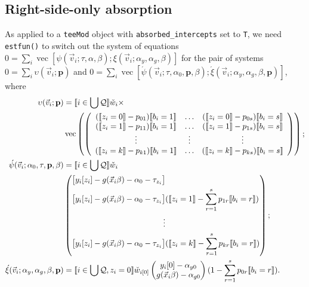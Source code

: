 \documentclass{article}
\DeclarePairedDelimiter{\indicator}{\llbracket}{\rrbracket}
\newcommand{\owt}[1][{[z_{i}]}]{\ensuremath{\check{w}_{i#1}}}
\newcommand{\absorbInterceptsEF}{\upsilon}
\begin{document}
\subsection{Right-side-only absorption}\label{sec:right-side-only}
As applied to a \texttt{teeMod} object with
\texttt{absorbed\_intercepts} set to \texttt{T}, we need \texttt{estfun()} to switch out the system of equations
$0=\sum_{i}\operatorname{vec}[\psi(\vec{v}_{i}; \tau, \alpha, \beta); \xi(\vec{v}_{i}; \alpha_{y}, \alpha_{g}, \beta)]$
for the pair of systems $0 = \sum_{i}\absorbInterceptsEF(\vec{v}_{i}; \mathbf{p})$ and
$0= \sum_{i}\operatorname{vec}[\acute{\psi}(\vec{v}_{i}; \tau, \alpha_{0}, \mathbf{p}, \beta); \acute{\xi}(\vec{v}_{i}; \alpha_{y}, \alpha_{g}, \beta, \mathbf{p})]$, where
\begin{align}
  \absorbInterceptsEF(\vec{v}_{i}; \mathbf{p}) &=
                                             \indicator{i \in \bigcup \mathcal{Q}} \owt[] \times \nonumber \\
  &\operatorname{vec}\left(%
    \left(
    \begin{array}{ccc}
      (\indicator{z_{i}=0}-p_{01})\indicator{b_{i}=1}
      &\ldots
      &
        (\indicator{z_{i}=0}-p_{0s})\indicator{b_{i}=s}
      \\
      (\indicator{z_{i}=1}-p_{11})\indicator{b_{i}=1}
      &\ldots
      &
        (\indicator{z_{i}=1}-p_{1s})\indicator{b_{i}=s}
      \\
      \vdots & \vdots & \vdots \\
      (\indicator{z_{i}=k}-p_{k1})\indicator{b_{i}=1}
      &\ldots
      &
        (\indicator{z_{i}=k}-p_{ks})\indicator{b_{i}=s}\\                                      \end{array}
  \right)%
  \right) ;\nonumber \\
  \acute{\psi}(\vec{v}_{i}; \alpha_{0}, \tau, \mathbf{p}, \beta) &=
\indicator{i \in \bigcup \mathcal{Q}}\owt[] \nonumber \\
&\left(
  \begin{aligned}
\big[y_{i}[z_{i}]
    -
    g(\vec{x}_{i}\beta)-{\alpha}_{0}-\tau_{z_{i}}\big]& \\
   \big[y_{i}[z_{i}]
    -
    g(\vec{x}_{i}\beta)-{\alpha}_{0}-\tau_{z_{i}}\big]
    &(
    \indicator{z_{i}=1} - \sum_{r=1}^{s}p_{1r}\indicator{b_{i}=r})\\
    \vdots \\
    {}\big[y_{i}[z_{i}]
    - g(\vec{x}_{i}\beta) - {\alpha}_{0}-
    \tau_{z_{i}}\big]
    &(\indicator{z_{i}=k}
    - \sum_{r=1}^{s}p_{kr}\indicator{b_{i}=r})\\
  \end{aligned}
  \right) ; \label{eq:upsilondef}\\
  \acute{\xi}(\vec{v}_{i}; \alpha_{y}, \alpha_{g}, \beta, \mathbf{p}) &=
\indicator{i \in \bigcup \mathcal{Q}, z_{i}=0}\owt[{[0]}]  \begin{pmatrix}
        y_{i}[0] - \alpha_{y0} \\
g(\vec{x}_{i}\beta) - \alpha_{g0}
  \end{pmatrix}
  (1 - \sum_{r=1}^{s}p_{0r}\indicator{b_{i}=r}).\label{eq:35}
\end{align}
\end{document}
